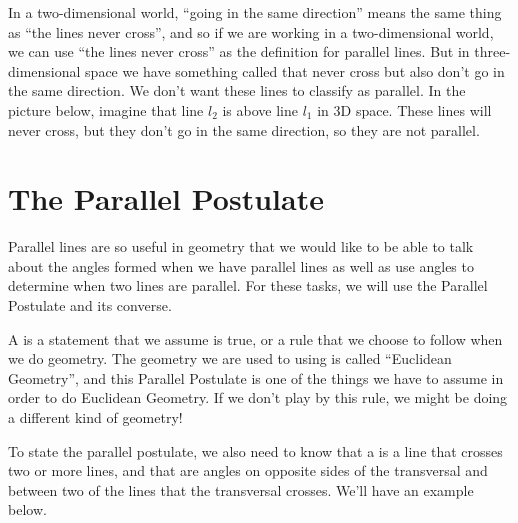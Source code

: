 \documentclass{ximera}
\begin{document}
In a two-dimensional world, ``going in the same direction'' means the same thing as ``the lines never cross'', and so if we are working in a two-dimensional world, we can use ``the lines never cross'' as the definition for parallel lines. But in three-dimensional space we have something called  that never cross but also don't go in the same direction. We don't want these lines to classify as parallel. In the picture below, imagine that line $l_2$ is above line $l_1$ in 3D space. These lines will never cross, but they don't go in the same direction, so they are not parallel.
\begin{image}
\end{image} 

\section{The Parallel Postulate}

Parallel lines are so useful in geometry that we would like to be able to talk about the angles formed when we have parallel lines as well as use angles to determine when two lines are parallel. For these tasks, we will use the Parallel Postulate and its converse. 

A  is a statement that we assume is true, or a rule that we choose to follow when we do geometry. The geometry we are used to using is called ``Euclidean Geometry'', and this Parallel Postulate is one of the things we have to assume in order to do Euclidean Geometry. If we don't play by this rule, we might be doing a different kind of geometry!

To state the parallel postulate, we also need to know that a  is a line that crosses two or more lines, and that  are angles on opposite sides of the transversal and between two of the lines that the transversal crosses. We'll have an example below.
\end{document}
